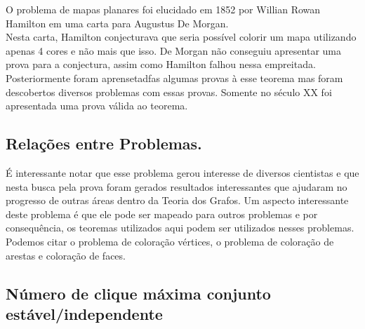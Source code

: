 \documentclass[12pt]{article}
\begin{document}
O problema de mapas planares foi elucidado em 1852 por Willian Rowan Hamilton em uma carta para Augustus De Morgan.\\
Nesta carta, Hamilton conjecturava que seria possível colorir um mapa utilizando apenas 4 cores e não mais que isso. De Morgan não conseguiu apresentar uma prova para a conjectura, assim como Hamilton falhou nessa empreitada. Posteriormente foram aprensetadfas algumas provas à esse teorema mas foram descobertos diversos problemas com essas provas. Somente no século XX foi apresentada uma prova válida ao teorema.\\


\subsection{Relações entre Problemas.}

É interessante notar que esse problema gerou interesse de diversos cientistas e que nesta busca pela prova foram gerados resultados interessantes que ajudaram no progresso de outras áreas dentro da Teoria dos Grafos. Um aspecto interessante deste problema é que ele pode ser mapeado para outros problemas e por consequência, os teoremas utilizados aqui podem ser utilizados nesses problemas. Podemos citar o problema de coloração vértices, o problema de coloração de arestas e coloração de faces.


\subsection{Número de clique máxima conjunto estável/independente}



\end{document}

